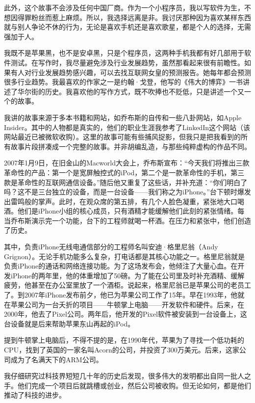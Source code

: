 \documentclass[
  letterpaper,
  DIV=11,
  numbers=noendperiod]{scrreprt}
\begin{document}
此外，这个故事不会涉及任何中国厂商。作为一个小程序员，我以写软件为生，不想因得罪粉丝而惹上麻烦。所以，我选择远离是非。我讨厌那种因为喜欢某样东西就与别人争论不休的行为，无论是喜欢手机还是喜欢歌星，都是个人的选择，无需强加于人。

我既不是苹果黑，也不是安卓黑，只是个程序员，这两种手机我都有好几部用于软件测试。在写作时，我尽量避免涉及行业发展趋势，虽然那看起来很有前瞻性。如果有人对行业发展趋势感兴趣，可以去找互联网女皇的预测报告。她每年都会预测很多行业趋势。我最喜欢的作家之一是约翰·戈登，他写的《伟大的博弈》一书讲述了华尔街的历史。我喜欢他的写作方式，既不吹捧也不贬低，只是讲述一个又一个的故事。

我讲的故事来源于多本书籍和网站，如乔布斯的自传和一些八卦网站，如Apple
Insider。其中的人物都是真实的，他们的职业生涯我参考了LinkedIn这个网站（该网站最近已被微软收购）。这里的故事可能有些捕风捉影，但我只是把我看到的所有故事片段拼凑成一个完整的故事。并非胡编乱造，与那些纯粹虚构的作品不同。

2007年1月9日，在旧金山的Macworld大会上，乔布斯宣布：``今天我们将推出三款革命性的产品：第一个是宽屏触控式的iPod，第二个是一款革命性的手机，第三款是革命性的互联网通信设备。''随后他又重复了这些话，并补充道：``你们明白了吗？这不是三台独立的设备，而是一台设备------我们称之为iPhone。''台下顿时爆发出雷鸣般的掌声。此时，在观众席的第五排，有几个人脸色凝重，紧张地大口喝酒。他们是iPhone小组的核心成员，只有酒精才能缓解他们此刻的紧张情绪。每当乔布斯演示完一个功能，台下的工程师就喝一杯酒。在压力和紧张中，他们创造了历史。

其中，负责iPhone无线电通信部分的工程师名叫安迪·格里尼翁（Andy
Grignon）。无论手机功能多么复杂，打电话都是其核心功能之一。格里尼翁就是负责iPhone的通话和网络连接功能。为了这场发布会，他倾注了大量心血。在开发iPhone的两年里，他的体重增加了50磅。为了能在公司里及时补充酒精、缓解疲劳，他甚至在办公室里放了一个酒柜。说起来，格里尼翁已是苹果公司的老员工了。到2007年iPhone发布前夕，他已为苹果公司工作了15年。早在1993年，他就在苹果公司为一台夭折的项目------牛顿掌上电脑------开发软件和硬件。后来，在2000年，他去了Pixel公司。两年后，他开发的Pixel软件被安装到一台设备上，这台设备就是后来帮助苹果东山再起的iPod。

提到牛顿掌上电脑后，不得不提的是，在1990年代，苹果为了寻找一个低功耗的CPU，找到了英国的一家名叫Acorn的公司，并投资了300万美元。后来，这家公司成为了名满天下的ARM公司。

我仔细研究过科技界短短几十年的历史后发现，很多伟大的发明都出自同一批人之手。他们完成一个项目后就跳槽或创业，然后公司被收购。但无论如何，都是他们推动了科技的进步。
\end{document}
